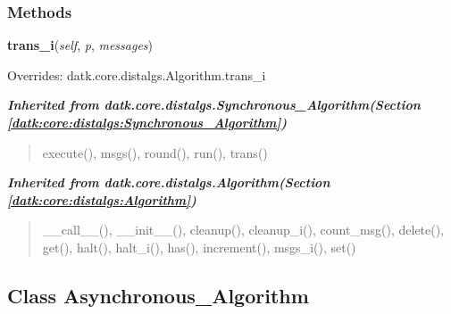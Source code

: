 
  \subsubsection{Methods}

    \vspace{0.5ex}

\hspace{.8\funcindent}\begin{boxedminipage}{\funcwidth}

    \raggedright \textbf{trans\_i}(\textit{self}, \textit{p}, \textit{messages})

\setlength{\parskip}{2ex}
\setlength{\parskip}{1ex}
      Overrides: datk.core.distalgs.Algorithm.trans\_i

    \end{boxedminipage}


\large{\textbf{\textit{Inherited from datk.core.distalgs.Synchronous\_Algorithm\textit{(Section \ref{datk:core:distalgs:Synchronous_Algorithm})}}}}

\begin{quote}
execute(), msgs(), round(), run(), trans()
\end{quote}

\large{\textbf{\textit{Inherited from datk.core.distalgs.Algorithm\textit{(Section \ref{datk:core:distalgs:Algorithm})}}}}

\begin{quote}
\_\_call\_\_(), \_\_init\_\_(), cleanup(), cleanup\_i(), count\_msg(), delete(), get(), halt(), halt\_i(), has(), increment(), msgs\_i(), set()
\end{quote}


\subsection{Class Asynchronous\_Algorithm}


